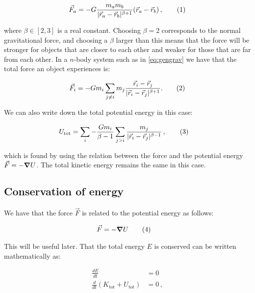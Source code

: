 \documentclass[reprint,english,notitlepage]{revtex4-1}  %
\newcommand\numberthis{\addtocounter{equation}{1}\tag{\theequation}}
\begin{document}
\begin{align*}
\vec{F}_a = - G \frac{m_a m_b}{|\vec{r}_a - \vec{r}_b|^{\beta + 1} } ( \vec{r}_a - \vec{r}_b) \, , \numberthis \label{eq:beta_grav}
\end{align*}

where $\beta \in [2,3]$ is a real constant. Choosing $\beta = 2$ corresponds to the normal gravitational force, and choosing a $\beta$ larger than this means that the force will be stronger for objects that are closer to each other and weaker for those that are far from each other. In a $n$-body system such as in \eqref{eq:gengrav} we have that the total force an object experiences is:

\begin{align*}
\vec{F}_{i} = -Gm_{i}\sum_{j\neq i}m_{j}\frac{\vec{r}_{i}-\vec{r}_{j}}{|\vec{r}_{i}-\vec{r}_{j}|^{\beta + 1}}. \numberthis \label{eq:beta_gengrav}
\end{align*}

We can also write down the total potential energy in this case:

\begin{align*}
U_\text{tot} &= \sum\limits_i - \frac{G m_i}{\beta - 1} \sum\limits_{j > i} \frac{m_j}{|\vec{r}_i - \vec{r}_j|^{\beta-1}} \, , \numberthis \label{eq:beta_tot_pot_en}
\end{align*}

which is found by using the relation between the force and the potential energy $\vec{F} = -\gradient U$. The total kinetic energy remains the same in this case.

\subsection{Conservation of energy} \label{sec:II:c}

We have that the force $\vec{F}$ is related to the potential energy as follows:

\begin{align*}
\vec{F} &= - \gradient U \numberthis \label{eq:force_pot_en}
\end{align*}

This will be useful later. That the total energy $E$ is conserved can be written mathematically as:

\begin{align*}
\frac{dE}{dt} &= 0 \\
\frac{d}{dt} (K_\text{tot} + U_\text{tot}) &= 0 \, ,
\end{align*}
\end{document}
